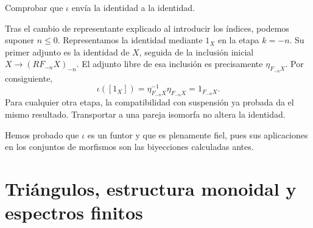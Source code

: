 \begin{ejer}
Comprobar que $\iota$ envía la identidad a la identidad.
\end{ejer}
\begin{sol}
Tras el cambio de representante explicado al introducir los índices, podemos suponer $n\le0$. Representamos la identidad mediante $1_X$ en la etapa $k=-n$. Su primer adjunto es la identidad de $X$, seguida de la inclusión inicial $X\to(RF_{-n}X)_{-n}$. El adjunto libre de esa inclusión es precisamente $\eta_{F_{-n}X}$. Por consiguiente,
\[
\iota([1_X])=\eta_{F_{-n}X}^{-1}\eta_{F_{-n}X}=1_{F_{-n}X}.
\]
Para cualquier otra etapa, la compatibilidad con suspensión ya probada da el mismo resultado. Transportar a una pareja isomorfa no altera la identidad.
\end{sol}
Hemos probado que $\iota$ es un funtor y que es plenamente fiel, pues sus aplicaciones en los conjuntos de morfismos son las biyecciones calculadas antes.

\section{Triángulos, estructura monoidal y espectros finitos}

